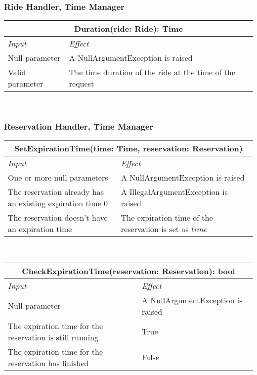 		
		
		\subsubsection*{Ride Handler, Time Manager}
			\begin{tabular}{ |l|l| }
				\hline
				\multicolumn{2}{|c|}{Duration(ride: Ride): Time}\\
				\hline
				\textit{Input} & \textit{Effect}\\ \hline
				Null parameter & A NullArgumentException is raised\\ \hline
				Valid parameter & The time duration of the ride at the time of the request\\ \hline
			\end{tabular}
			\\
		
		
		
		\subsubsection*{Reservation Handler, Time Manager}
			\begin{tabular}{ |l|l| }
				\hline
				\multicolumn{2}{|c|}{SetExpirationTime(time: Time, reservation: Reservation)}\\
				\hline
				\textit{Input} & \textit{Effect}\\ \hline
				One or more null parameters & A NullArgumentException is raised\\ \hline
				The reservation already has an existing expiration time 0& A IllegalArgumentException is raised \\ \hline %
				The reservation doesn't have an expiration time & The expiration time of the reservation is set as $time$\\ \hline
			\end{tabular}
			\\
			\begin{tabular}{ |l|l| }
				\hline
				\multicolumn{2}{|c|}{CheckExpirationTime(reservation: Reservation): bool}\\
				\hline
				\textit{Input} & \textit{Effect}\\ \hline
				Null parameter & A NullArgumentException is raised\\ \hline
				The expiration time for the reservation is still running & True\\ \hline
				The expiration time for the reservation has finished & False\\ \hline
			\end{tabular}
			\\
		
